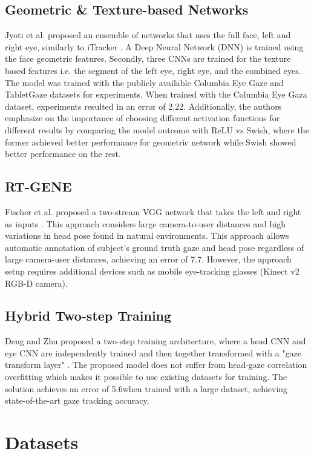 \subsection{Geometric \& Texture-based Networks}
Jyoti et al. proposed an ensemble of networks that uses the full face, left and right eye, similarly to iTracker \cite{deng_monocular_2017}.
A Deep Neural Network (DNN) is trained using the face geometric features. Secondly, three CNNs are trained for the texture based features i.e. the segment of the left eye, right eye, and the combined eyes. The model was trained with the publicly available Columbia Eye Gaze and TabletGaze datasets for experiments. When trained with the Columbia Eye Gaza dataset, experiments resulted in an error of 2.22\degree. Additionally, the authors emphasize on the importance of choosing
different activation functions for different results by comparing the model outcome with ReLU vs Swish, where the former achieved better performance for geometric network while Swish showed better performance on the rest.

\subsection{RT-GENE}
Fischer et al. proposed a two-stream VGG network that takes the left and right as inputs \cite{fischer_rt-gene_2018}. This approach considers large camera-to-user distances and high variations in head pose found in natural environments. This approach allows automatic annotation of subject's ground truth gaze and head pose regardless of large camera-user distances, achieving an error of 7.7\degree. However, the approach setup requires additional devices such as mobile eye-tracking glasses (Kinect v2 RGB-D camera).

\subsection{Hybrid Two-step Training}
Deng and Zhu proposed a two-step training architecture, where a head CNN and eye CNN are independently trained and then together transformed with a "gaze transform layer" \cite{deng_monocular_2017}. The proposed model does not suffer from head-gaze correlation overfitting which makes it possible to use existing datasets for training. The solution achieves an error of 5.6\degree when trained with a large dataset, achieving state-of-the-art gaze tracking accuracy. 

\section{Datasets}
\label{state-art-datasets}


